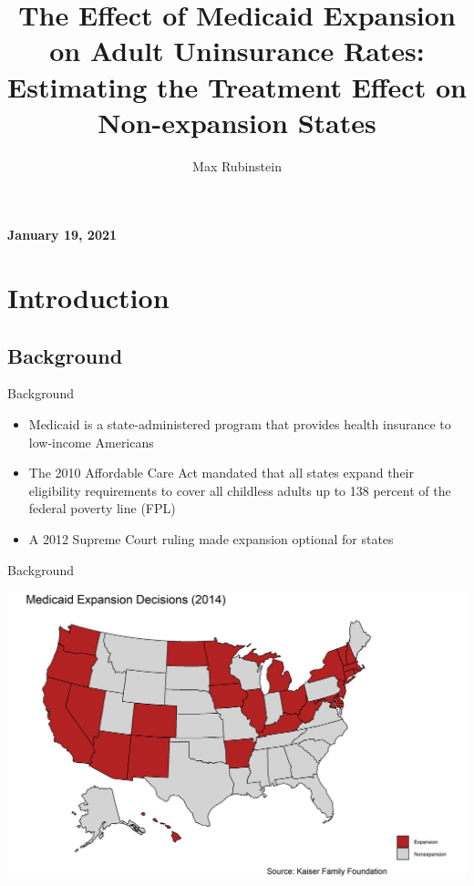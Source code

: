 \documentclass[hyperref={pdfpagelabels=false}]{beamer}
\title{The Effect of Medicaid Expansion on Adult Uninsurance Rates: Estimating the Treatment Effect on Non-expansion States}
\author[shortname]{Max Rubinstein \\}
\institute[]{\and \vspace{-0.26in} \and \vspace{-0.1in}}%
\date{}
\begin{document}

\begin{frame}
\titlepage
\centering 
\vspace{-0.5in}
\textbf{January 19, 2021}
\end{frame} 

\section{Introduction}
\subsection{Background}
\begin{frame}{Background}
\begin{itemize}
    \item Medicaid is a state-administered program that provides health insurance to low-income Americans \bigskip 
    
    \item The 2010 Affordable Care Act mandated that all states expand their eligibility requirements to cover all childless adults up to 138 percent of the federal poverty line (FPL) \bigskip
    
    \item A 2012 Supreme Court ruling made expansion optional for states \bigskip
    
\end{itemize}
\end{frame}

\begin{frame}{Background}
    \begin{center}
	\includegraphics[scale=0.5]{01_Plots/expansion-map.png}
    \end{center}
\end{frame}
\end{document}
